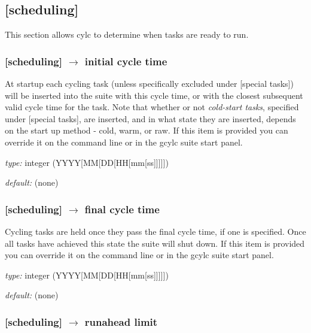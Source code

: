 \subsection{[scheduling]}

This section allows cylc to determine when tasks are ready to run.

\subsubsection[initial cycle time]{[scheduling] $\rightarrow$ initial cycle time}

At startup each cycling task (unless specifically excluded under
[special tasks]) will be inserted into the suite with this cycle time,
or with the closest subsequent valid cycle time for the task. Note that
whether or not {\em cold-start tasks}, specified under [special tasks],
are inserted, and in what state they are inserted, depends on the start
up method - cold, warm, or raw.  If this item is provided you can 
override it on the command line or in the gcylc suite start panel.

\begin{myitemize}
    \item {\em type:} integer (YYYY[MM[DD[HH[mm[ss]]]]])
    \item {\em default:} (none)
\end{myitemize}

\subsubsection[final cycle time]{[scheduling] $\rightarrow$ final cycle time}

Cycling tasks are held once they pass the final cycle time, if one is
specified. Once all tasks have achieved this state the suite will shut
down. If this item is provided you can override it on the command line
or in the gcylc suite start panel.

\begin{myitemize}
    \item {\em type:} integer (YYYY[MM[DD[HH[mm[ss]]]]])
    \item {\em default:} (none)
\end{myitemize}

\subsubsection[runahead limit]{[scheduling] $\rightarrow$ runahead limit}

